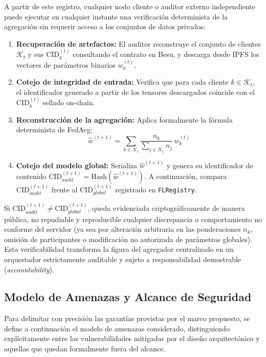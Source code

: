 A partir de este registro, cualquier nodo cliente o auditor externo independiente puede ejecutar en cualquier instante una verificación determinista de la agregación sin requerir acceso a los conjuntos de datos privados:
\begin{enumerate}
    \item \textbf{Recuperación de artefactos:} El auditor reconstruye el conjunto de clientes $\mathcal{K}_t$ y sus $\text{CID}_k^{(t)}$ consultando el contrato en Besu, y descarga desde IPFS los vectores de parámetros binarios $w_k^{(t)}$.
    \item \textbf{Cotejo de integridad de entrada:} Verifica que para cada cliente $k \in \mathcal{K}_t$, el identificador generado a partir de los tensores descargados coincide con el $\text{CID}_k^{(t)}$ sellado on-chain.
    \item \textbf{Reconstrucción de la agregación:} Aplica formalmente la fórmula determinista de FedAvg:
    \begin{equation}
    \hat{w}^{(t+1)} = \sum_{k \in \mathcal{K}_t} \frac{n_k}{\sum_{j \in \mathcal{K}_t} n_j} \, w_k^{(t)}
    \end{equation}
    \item \textbf{Cotejo del modelo global:} Serializa $\hat{w}^{(t+1)}$ y genera su identificador de contenido $\text{CID}_{audit}^{(t+1)} = \text{Hash}(\hat{w}^{(t+1)})$. A continuación, compara $\text{CID}_{audit}^{(t+1)}$ frente al $\text{CID}_{global}^{(t+1)}$ registrado en \texttt{FLRegistry}.
\end{enumerate}
Si $\text{CID}_{audit}^{(t+1)} \neq \text{CID}_{global}^{(t+1)}$, queda evidenciada criptográficamente de manera pública, no repudiable y reproducible cualquier discrepancia o comportamiento no conforme del servidor (ya sea por alteración arbitraria en las ponderaciones $n_k$, omisión de participantes o modificación no autorizada de parámetros globales). Esta verificabilidad transforma la figura del agregador centralizado en un orquestador estrictamente auditable y sujeto a responsabilidad demostrable (\textit{accountability}).

\subsection{Modelo de Amenazas y Alcance de Seguridad}
\label{subsec:modelo_amenazas}
Para delimitar con precisión las garantías provistas por el marco propuesto, se define a continuación el modelo de amenazas considerado, distinguiendo explícitamente entre las vulnerabilidades mitigadas por el diseño arquitectónico y aquellas que quedan formalmente fuera del alcance.

